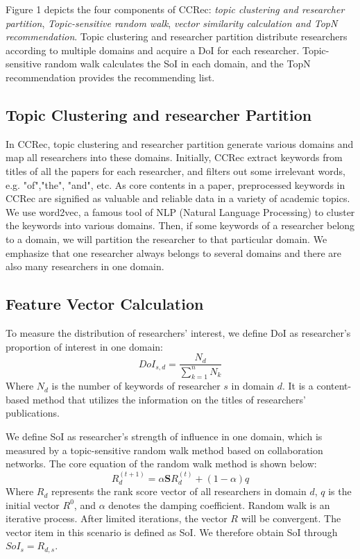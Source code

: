 \documentclass{chi-ext}
\begin{document}
Figure 1 depicts the four components of CCRec: \textit{topic clustering and researcher partition}, \textit{Topic-sensitive random walk}, \textit{vector similarity calculation and TopN recommendation}. Topic clustering and researcher partition distribute researchers according to multiple domains and acquire a DoI for each researcher. Topic-sensitive random walk calculates the SoI in each domain, and the TopN recommendation provides the recommending list.

\subsection{Topic Clustering and researcher Partition}
In CCRec, topic clustering and researcher partition generate various domains and map all researchers into these domains. Initially, CCRec extract keywords from titles of all the papers for each researcher, and filters out some irrelevant words, e.g. "of","the", "and", etc. As core contents in a paper, preprocessed keywords in CCRec are signified as valuable and reliable data in a variety of academic topics. We use word2vec, a famous tool of NLP (Natural Language Processing) to cluster the keywords into various domains. Then, if some keywords of a researcher belong to a domain, we will partition the researcher to that particular domain. We emphasize that one researcher always belongs to several domains and there are also many researchers in one domain.

\subsection{Feature Vector Calculation}
To measure the distribution of researchers' interest, we define DoI as researcher's proportion of interest in one domain:
\begin{equation}
DoI_{s,d}=\frac{N_{d}}{\sum_{k=1}^{n} N_{k}}
\end{equation}
Where $N_{d}$ is the number of keywords of researcher $s$ in domain $d$. It is a content-based method that utilizes the information on the titles of researchers' publications.

We define SoI as researcher's strength of influence in one domain, which is measured by a topic-sensitive random walk method based on collaboration networks. The core equation of the random walk method is shown below:
\begin{equation}
R_{d}^{(t+1)}=\alpha \mathbf{S}R_{d}^{(t)}+(1-\alpha)q
\end{equation}
Where $R_{d}$ represents the rank score vector of all researchers in domain $d$, $q$ is the initial vector $R^0$, and $\alpha$ denotes the damping coefficient. Random walk is an iterative process. After limited iterations, the vector $R$ will be convergent. The vector item in this scenario is defined as SoI. We therefore obtain SoI through $SoI_{s}=R_{d,s}$.
\end{document}
